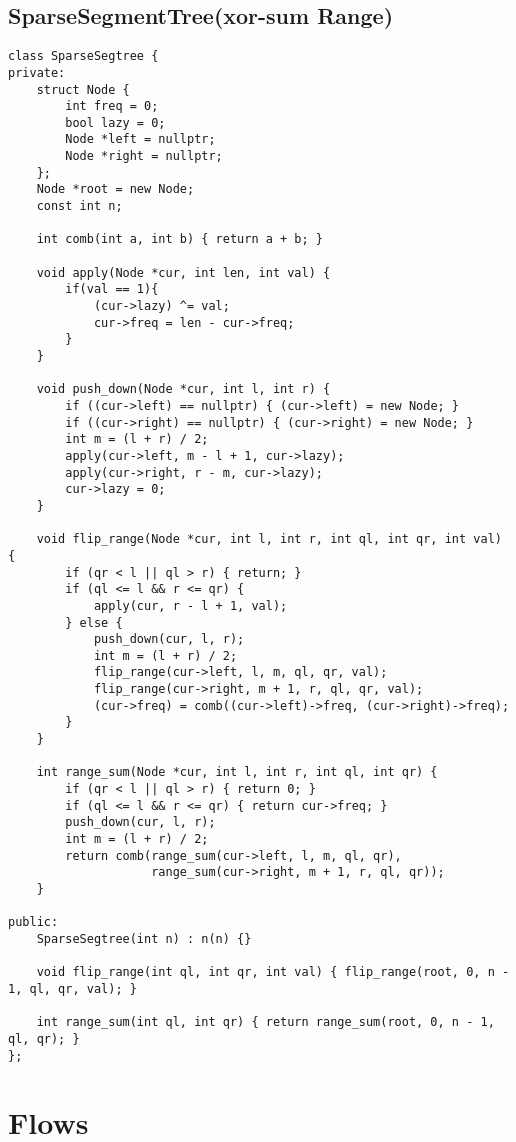 \documentclass{article}
\begin{document}
\subsection{SparseSegmentTree(xor-sum Range)}
\begin{verbatim}
class SparseSegtree {
private:
    struct Node {
        int freq = 0;
        bool lazy = 0;
        Node *left = nullptr;
        Node *right = nullptr;
    };
    Node *root = new Node;
    const int n;

    int comb(int a, int b) { return a + b; }

    void apply(Node *cur, int len, int val) {
        if(val == 1){
            (cur->lazy) ^= val;
            cur->freq = len - cur->freq;
        }
    }

    void push_down(Node *cur, int l, int r) {
        if ((cur->left) == nullptr) { (cur->left) = new Node; }
        if ((cur->right) == nullptr) { (cur->right) = new Node; }
        int m = (l + r) / 2;
        apply(cur->left, m - l + 1, cur->lazy);
        apply(cur->right, r - m, cur->lazy);
        cur->lazy = 0;
    }

    void flip_range(Node *cur, int l, int r, int ql, int qr, int val) {
        if (qr < l || ql > r) { return; }
        if (ql <= l && r <= qr) {
            apply(cur, r - l + 1, val);
        } else {
            push_down(cur, l, r);
            int m = (l + r) / 2;
            flip_range(cur->left, l, m, ql, qr, val);
            flip_range(cur->right, m + 1, r, ql, qr, val);
            (cur->freq) = comb((cur->left)->freq, (cur->right)->freq);
        }
    }

    int range_sum(Node *cur, int l, int r, int ql, int qr) {
        if (qr < l || ql > r) { return 0; }
        if (ql <= l && r <= qr) { return cur->freq; }
        push_down(cur, l, r);
        int m = (l + r) / 2;
        return comb(range_sum(cur->left, l, m, ql, qr),
                    range_sum(cur->right, m + 1, r, ql, qr));
    }

public:
    SparseSegtree(int n) : n(n) {}

    void flip_range(int ql, int qr, int val) { flip_range(root, 0, n - 1, ql, qr, val); }

    int range_sum(int ql, int qr) { return range_sum(root, 0, n - 1, ql, qr); }
};
\end{verbatim}

\section{Flows}
\end{document}
